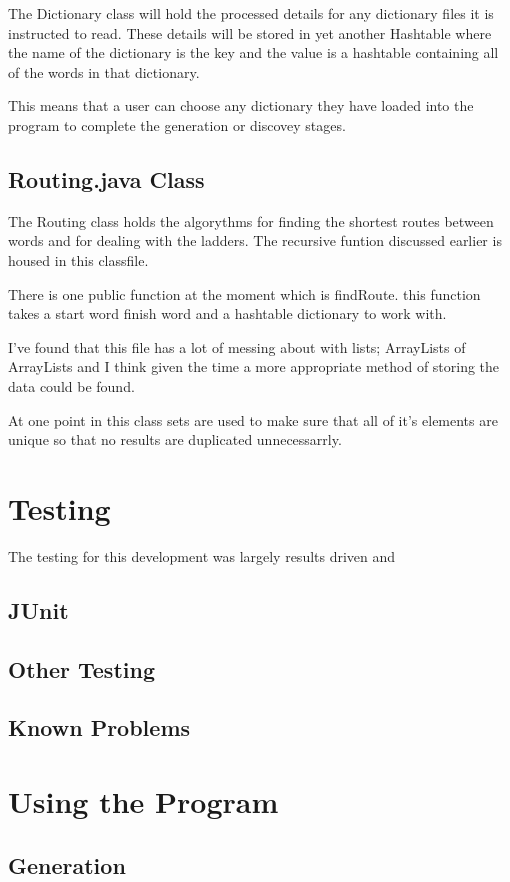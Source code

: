 \documentclass[final,a4paper,twoside,12pt]{report}
\begin{document}
The Dictionary class will hold the processed details for any
dictionary files it is instructed to read. These details will be
stored in yet another Hashtable where the name of the dictionary
is the key and the value is a hashtable containing all of the
words in that dictionary.

This means that a user can choose any dictionary they have loaded
into the program to complete the generation or discovey stages. 
\subsection{Routing.java Class}
The Routing class holds the algorythms for finding the shortest
routes between words and for dealing with the ladders. The recursive
funtion discussed earlier is housed in this classfile.

There is one public function at the moment which is findRoute.
this function takes a start word finish word and a hashtable 
dictionary to work with.

I've found that this file has a lot of messing about with lists;
ArrayLists of ArrayLists and I think given the time a more appropriate
method of storing the data could be found.

At one point in this class sets are used to make sure that all 
of it's elements are unique so that no results are duplicated
unnecessarrly.

\section{Testing}
The testing for this development was largely results driven and
\subsection{JUnit}

\subsection{Other Testing}
\subsection{Known Problems}

\section{Using the Program}
\subsection{Generation}
\end{document}
